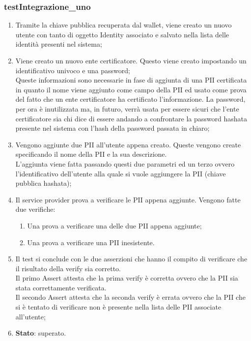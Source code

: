 \subsubsection{testIntegrazione\_uno}
\begin{enumerate}
	\item Tramite la chiave pubblica recuperata dal wallet, viene creato un nuovo utente con tanto di oggetto Identity associato e salvato nella lista delle identità presenti nel sistema;
	\item Viene creato un nuovo ente certificatore. Questo viene creato impostando un identificativo univoco e una password;\\
	Queste informazioni sono necessarie in fase di aggiunta di una \gls{PII} certificata in quanto il nome viene aggiunto come campo della \gls{PII} ed usato come prova del fatto che un ente certificatore ha certificato l'informazione. La password, per ora è inutilizzata ma, in futuro, verrà usata per essere sicuri che l'ente certificatore sia chi dice di essere andando a confrontare la password hashata presente nel sistema con l'hash della password passata in chiaro;
	\item Vengono aggiunte due \gls{PII} all'utente appena creato. Queste vengono create specificando il nome della \gls{PII} e la sua descrizione.\\
	L'aggiunta viene fatta passando questi due parametri ed un terzo ovvero l'identificativo dell'utente alla quale si vuole aggiungere la \gls{PII} (chiave pubblica hashata);
	\item Il service provider prova a verificare le \gls{PII} appena aggiunte. Vengono fatte due verifiche:
	\begin{enumerate}
		\item Una prova a verificare una delle due \gls{PII} appena aggiunte;
		\item Una prova a verificare una \gls{PII} inesistente.
	\end{enumerate}
	\item Il test si conclude con le due asserzioni che hanno il compito di verificare che il risultato della verify sia corretto.\\
	Il primo Assert attesta che la prima verify è corretta ovvero che la \gls{PII} sia stata correttamente verificata.\\
	Il secondo Assert attesta che la seconda verify è errata ovvero che la \gls{PII} che si è tentato di verificare non è presente nella lista delle PII associate all'utente;
	\item \textbf{Stato}: superato.
\end{enumerate}
